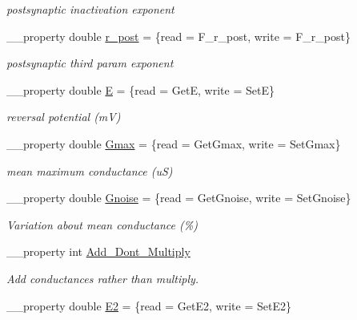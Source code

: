 \begin{DoxyCompactItemize}
\begin{DoxyCompactList}\small\item\em postsynaptic inactivation exponent \end{DoxyCompactList}\item 
\hypertarget{class_t_h_h2_current_afc92a0d4c96ea74bf9d88929b5d7087b}{\+\_\+\+\_\+property double \hyperlink{class_t_h_h2_current_afc92a0d4c96ea74bf9d88929b5d7087b}{r\+\_\+post} = \{read = F\+\_\+r\+\_\+post, write = F\+\_\+r\+\_\+post\}}\label{class_t_h_h2_current_afc92a0d4c96ea74bf9d88929b5d7087b}

\begin{DoxyCompactList}\small\item\em postsynaptic third param exponent \end{DoxyCompactList}\item 
\hypertarget{class_t_h_h2_current_a1a6f4672499821ffb2a1c4f172d9341c}{\+\_\+\+\_\+property double \hyperlink{class_t_h_h2_current_a1a6f4672499821ffb2a1c4f172d9341c}{E} = \{read = Get\+E, write = Set\+E\}}\label{class_t_h_h2_current_a1a6f4672499821ffb2a1c4f172d9341c}

\begin{DoxyCompactList}\small\item\em reversal potential (m\+V) \end{DoxyCompactList}\item 
\hypertarget{class_t_h_h2_current_a297dfe07020e27bff9bf4b4ba520f1e6}{\+\_\+\+\_\+property double \hyperlink{class_t_h_h2_current_a297dfe07020e27bff9bf4b4ba520f1e6}{Gmax} = \{read = Get\+Gmax, write = Set\+Gmax\}}\label{class_t_h_h2_current_a297dfe07020e27bff9bf4b4ba520f1e6}

\begin{DoxyCompactList}\small\item\em mean maximum conductance (u\+S) \end{DoxyCompactList}\item 
\hypertarget{class_t_h_h2_current_a2c75de8014b69355001de11fc3091165}{\+\_\+\+\_\+property double \hyperlink{class_t_h_h2_current_a2c75de8014b69355001de11fc3091165}{Gnoise} = \{read = Get\+Gnoise, write = Set\+Gnoise\}}\label{class_t_h_h2_current_a2c75de8014b69355001de11fc3091165}

\begin{DoxyCompactList}\small\item\em Variation about mean conductance (\%) \end{DoxyCompactList}\item 
\+\_\+\+\_\+property int \hyperlink{class_t_h_h2_current_ae06a0acf968c70a18ad2b9f3a490a131}{Add\+\_\+\+Dont\+\_\+\+Multiply}
\begin{DoxyCompactList}\small\item\em Add conductances rather than multiply. \end{DoxyCompactList}\item 
\hypertarget{class_t_h_h2_current_ad845b98630f025fba797e55a7744c9f0}{\+\_\+\+\_\+property double \hyperlink{class_t_h_h2_current_ad845b98630f025fba797e55a7744c9f0}{E2} = \{read = Get\+E2, write = Set\+E2\}}\label{class_t_h_h2_current_ad845b98630f025fba797e55a7744c9f0}


\end{DoxyCompactItemize}

